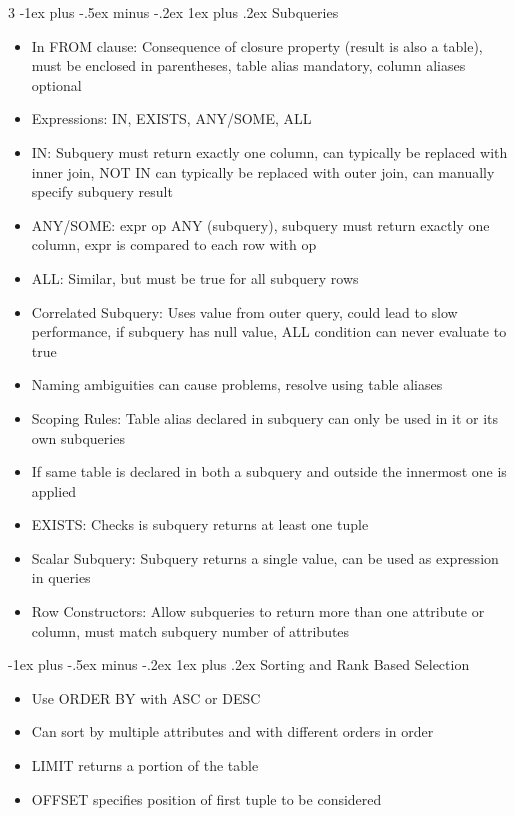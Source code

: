 \documentclass[10pt, landscape]{article}
\makeatletter
\renewcommand{\subsection}{\@startsection{subsection}{3}{0mm}%
                                {-1ex plus -.5ex minus -.2ex}%
                                {1ex plus .2ex}%
                                {\normalfont\small\bfseries}}%
\makeatother
\begin{document}
\begin{multicols*}{3}
\subsection{Subqueries}
\begin{itemize}
    \item In FROM clause: Consequence of closure property (result is also a table), must be enclosed in parentheses, table alias mandatory, column aliases optional
    \item Expressions: IN, EXISTS, ANY/SOME, ALL
    \item IN: Subquery must return exactly one column, can typically be replaced with inner join, NOT IN can typically be replaced with outer join, can manually specify subquery result
    \item ANY/SOME: expr op ANY (subquery), subquery must return exactly one column, expr is compared to each row with op
    \item ALL: Similar, but must be true for all subquery rows
    \item Correlated Subquery: Uses value from outer query, could lead to slow performance, if subquery has null value, ALL condition can never evaluate to true
    \item Naming ambiguities can cause problems, resolve using table aliases
    \item Scoping Rules: Table alias declared in subquery can only be used in it or its own subqueries
    \item If same table is declared in both a subquery and outside the innermost one is applied
    \item EXISTS: Checks is subquery returns at least one tuple
    \item Scalar Subquery: Subquery returns a single value, can be used as expression in queries
    \item Row Constructors: Allow subqueries to return more than one attribute or column, must match subquery number of attributes
\end{itemize}

\subsection{Sorting and Rank Based Selection}
\begin{itemize}
    \item Use ORDER BY with ASC or DESC
    \item Can sort by multiple attributes and with different orders in order
    \item LIMIT returns a portion of the table
    \item OFFSET specifies position of first tuple to be considered
\end{itemize}


\end{multicols*}
\end{document}
